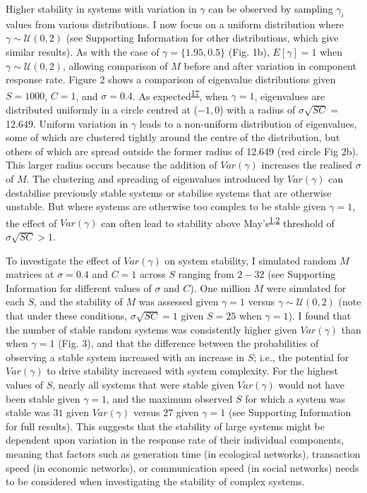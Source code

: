 \documentclass[]{article}
\begin{document}
Higher stability in systems with variation in \(\gamma\) can be observed
by sampling \(\gamma_{i}\) values from various distributions. I now
focus on a uniform distribution where \(\gamma \sim \mathcal{U}(0, 2)\)
(see Supporting Information for other distributions, which give similar
results). As with the case of \(\gamma = \{1.95, 0.5\}\) (Fig. 1b),
\(E[\gamma] = 1\) when \(\gamma \sim \mathcal{U}(0, 2)\), allowing
comparison of \(M\) before and after variation in component response
rate. Figure 2 shows a comparison of eigenvalue distributions given
\(S = 1000\), \(C = 1\), and \(\sigma = 0.4\). As
expected\textsuperscript{\protect\hyperlink{ref-Tao2010}{17}}, when
\(\gamma = 1\), eigenvalues are distributed uniformly in a circle
centred at (\(-1, 0\)) with a radius of \(\sigma\sqrt{SC} =\) 12.649.
Uniform variation in \(\gamma\) leads to a non-uniform distribution of
eigenvalues, some of which are clustered tightly around the centre of
the distribution, but others of which are spread outside the former
radius of 12.649 (red circle Fig 2b). This larger radius occurs because
the addition of \(Var(\gamma)\) increases the realised \(\sigma\) of
\(M\). The clustering and spreading of eigenvalues introduced by
\(Var(\gamma)\) can destabilise previously stable systems or stabilise
systems that are otherwise unstable. But where systems are otherwise too
complex to be stable given \(\gamma = 1\), the effect of \(Var(\gamma)\)
can often lead to stability above
May's\textsuperscript{\protect\hyperlink{ref-May1972}{1},\protect\hyperlink{ref-Allesina2012}{2}}
threshold of \(\sigma\sqrt{SC} > 1\).

To investigate the effect of \(Var(\gamma)\) on system stability, I
simulated random \(M\) matrices at \(\sigma = 0.4\) and \(C = 1\) across
\(S\) ranging from \(2-32\) (see Supporting Information for different
values of \(\sigma\) and \(C\)). One million \(M\) were simulated for
each \(S\), and the stability of \(M\) was assessed given \(\gamma = 1\)
versus \(\gamma \sim \mathcal{U}(0, 2)\) (note that under these
conditions, \(\sigma\sqrt{SC} = 1\) given \(S = 25\) when
\(\gamma = 1\)). I found that the number of stable random systems was
consistently higher given \(Var(\gamma)\) than when \(\gamma = 1\) (Fig.
3), and that the difference between the probabilities of observing a
stable system increased with an increase in \(S\); i.e., the potential
for \(Var(\gamma)\) to drive stability increased with system complexity.
For the highest values of \(S\), nearly all systems that were stable
given \(Var(\gamma)\) would not have been stable given \(\gamma = 1\),
and the maximum observed \(S\) for which a system was stable was \(31\)
given \(Var(\gamma)\) versus \(27\) given \(\gamma = 1\) (see Supporting
Information for full results). This suggests that the stability of large
systems might be dependent upon variation in the response rate of their
individual components, meaning that factors such as generation time (in
ecological networks), transaction speed (in economic networks), or
communication speed (in social networks) needs to be considered when
investigating the stability of complex systems.
\end{document}
